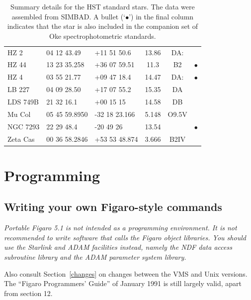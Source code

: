\documentclass[11pt,twoside]{article}
\newcommand{\stardocinitials}  {SUN}
\newcommand{\stardocnumber}    {86.21}
\newcommand{\stardocname}{\stardocinitials /\stardocnumber}
\newcommand{\htmlref}[2]{#1}
\newcommand{\xlabel}[1]{}
\newcommand{\latorhtm}[2]{#1}
\newcommand{\latorhtm}[2]{#2}
\begin{document}
\begin{table}[htbp]
\begin{center}
\begin{tabular}{lllccc}
HZ 2        & 04 12 43.49   & +11 51 50.6   &  13.86  & DA:    &   \\
HZ 44       & 13 23 35.258  & +36 07 59.51  &  11.3   & B2     & $\bullet$ \\
HZ 4        & 03 55 21.77   & +09 47 18.4   &  14.47  & DA:    & $\bullet$ \\
LB 227      & 04 09 28.50   & +17 07 55.2   &  15.35  & DA     &   \\
LDS 749B    & 21 32 16.1    & +00 15 15     &  14.58  & DB     &   \\
Mu Col      & 05 45 59.8950 & -32 18 23.166 &   5.148 & O9.5V  &   \\
NGC 7293    & 22 29 48.4    & -20 49 26     &  13.54  &        & $\bullet$ \\
Zeta Cas    & 00 36 58.2846 & +53 53 48.874 &   3.666 & B2IV   &   \\
\end{tabular}
\end{center}

\begin{quote}
\caption{Summary details for the HST standard stars.  The data were
assembled from SIMBAD.  A bullet (`$\bullet$') in the final column
indicates that the star is also included in the companion set of Oke
spectrophotometric standards.
\label{HSTSTAND} }
\end{quote}

\end{table}



\newpage %
\section{\xlabel{programming}Programming}
\markboth{Programming}{\stardocname}


\subsection{\label{proghint}Writing your own Figaro-style commands}

{\em
   Portable Figaro 5.1 is not intended as a programming environment. It
   is not recommended to write software that calls the Figaro object
   libraries. You should use the Starlink and ADAM facilities instead,
   namely the NDF data access subroutine library and the ADAM parameter
   system library.

   Also consult
   \latorhtm{Section~\ref{changes} on changes}
   {the section on \htmlref{changes}{changes}}
   between the VMS and Unix
   versions. The ``Figaro Programmers' Guide'' of January 1991 is still
   largely valid, apart from section 12.
\/}
\end{document}
